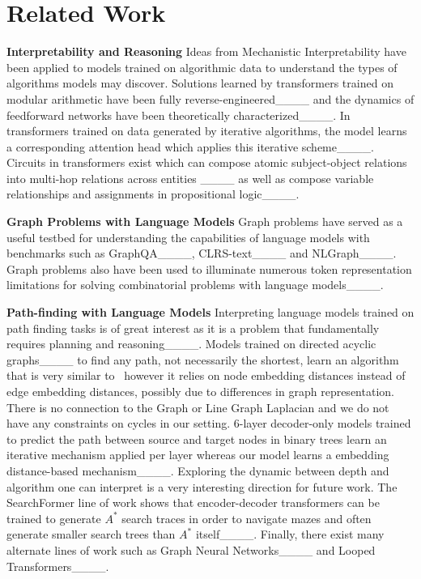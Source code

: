 \section{Related Work}
\vspace{-0.05in}
{\bf Interpretability and Reasoning}
Ideas from Mechanistic Interpretability have been applied to models trained on algorithmic data to understand the types of algorithms models may discover. Solutions learned by transformers trained on modular arithmetic have been fully reverse-engineered____ and the dynamics of feedforward networks have been theoretically characterized____. In transformers trained on data generated by iterative algorithms, the model learns a corresponding attention head which applies this iterative scheme____. Circuits in transformers exist which can compose atomic subject-object relations into multi-hop relations across entities ____ as well as compose variable relationships and assignments in propositional logic____.


{\bf Graph Problems with Language Models}
Graph problems have served as a useful testbed for understanding the capabilities of language models with benchmarks such as GraphQA____, CLRS-text____ and NLGraph____. Graph problems also have been used to illuminate numerous token representation limitations for solving combinatorial problems with language models____.

{\bf Path-finding with Language Models} 
Interpreting language models trained on path finding tasks is of great interest as it is a problem that fundamentally requires planning and reasoning____. Models trained on directed acyclic graphs____ to find any path, not necessarily the shortest, learn an algorithm that is very similar to \ours\ however it relies on node embedding distances instead of edge embedding distances, possibly due to differences in graph representation. There is no connection to the Graph or Line Graph Laplacian and we do not have any constraints on cycles in our setting.
6-layer decoder-only models trained to predict the path between source and target nodes in binary trees learn an iterative mechanism applied per layer whereas our model learns a embedding distance-based mechanism____. Exploring the dynamic between depth and algorithm one can interpret is a very interesting direction for future work.
The SearchFormer line of work shows that encoder-decoder transformers can be trained to generate $A^*$ search traces in order to navigate mazes and often generate smaller search trees than $A^*$ itself____. %
Finally, there exist many alternate lines of work such as Graph Neural Networks____ and Looped Transformers____.

\vspace{-0.1in}